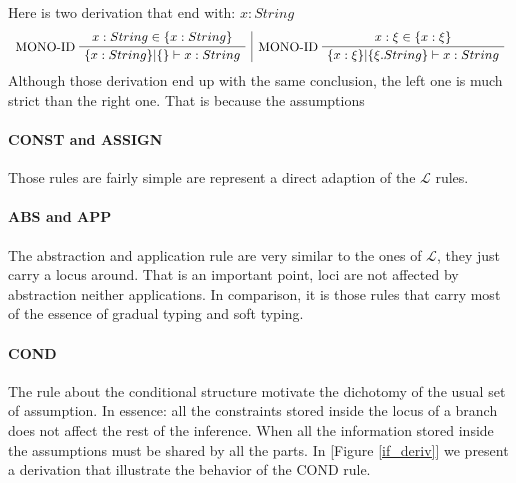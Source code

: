 \documentclass[a4paper]{report}
\newcommand{\lang}[0]{\mathcal{L}}
\newcommand{\reffig}[1]{[Figure \ref{#1}]}
\newcommand{\ax}[1]%
{\AxiomC{$#1$}}
\newcommand{\unc}[1]%
{\UnaryInfC{$#1$}}
\newcommand{\drule}%
{\DisplayProof}
\begin{document}
Here is two derivation that end with: $x:String$
$$\begin{array}{c|c}
\ax{x:String\in\{x:String\}}
\LeftLabel{MONO-ID}
\unc{\{x:String\}|\{\}\vdash x:String}
\drule
&
\ax{x:\xi\in\{x:\xi\}}
\LeftLabel{MONO-ID}
\unc{\{x:\xi\}|\{\xi.String\}\vdash x:String}
\drule
\end{array}$$
Although those derivation end up with the same conclusion, the left one is much strict than the right one. That is because the assumptions

\paragraph{CONST and ASSIGN} Those rules are fairly simple are represent a direct adaption of the $\lang$ rules.

\paragraph{ABS and APP} The abstraction and application rule are very similar to the ones of $\lang$, they just carry a locus around. That is an important point, loci are not affected by abstraction neither applications. In comparison, it is those rules that carry most of the essence of gradual typing and soft typing. 

\paragraph{COND} The rule about the conditional structure motivate the dichotomy of the usual set of assumption. In essence: all the constraints stored inside the locus of a branch does not affect the rest of the inference. When all the information stored inside the assumptions must be shared by all the parts. In \reffig{if_deriv} we present a derivation that illustrate the behavior of the COND rule.
\end{document}
